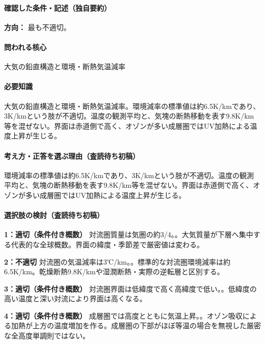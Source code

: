 \paragraph{確認した条件・記述（独自要約）}\mbox{}\par

\noindent\textbf{方向：} 最も不適切。\par

\paragraph{問われる核心} 大気の鉛直構造と環境・断熱気温減率

\paragraph{必要知識} 大気の鉛直構造と環境・断熱気温減率。環境減率の標準値は約6.5K/kmであり、3K/kmという肢が不適切。温度の観測平均と、気塊の断熱移動を表す9.8K/km等を混ぜない。界面は赤道側で高く、オゾンが多い成層圏ではUV加熱による温度上昇が生じる。

\paragraph{考え方・正答を選ぶ理由（査読待ち初稿）} 環境減率の標準値は約6.5K/kmであり、3K/kmという肢が不適切。温度の観測平均と、気塊の断熱移動を表す9.8K/km等を混ぜない。界面は赤道側で高く、オゾンが多い成層圏ではUV加熱による温度上昇が生じる。

\paragraph{選択肢の検討（査読待ち初稿）}\mbox{}\par

\noindent\textbf{1：適切（条件付き概数）} 対流圏質量は気圏の約3/4。。大気質量が下層へ集中する代表的な全球概数。界面の緯度・季節差で厳密値は変わる。\par

\noindent\textbf{2：不適切} 対流圏の気温減率は3℃/km。。標準的な対流圏環境減率は約6.5K/km。乾燥断熱9.8K/kmや湿潤断熱・実際の逆転層と区別する。\par

\noindent\textbf{3：適切（条件付き概数）} 対流圏界面は低緯度で高く高緯度で低い。。低緯度の高い温度と深い対流により界面は高くなる。\par

\noindent\textbf{4：適切（条件付き概数）} 成層圏では高度とともに気温上昇。。オゾン吸収による加熱が上方の温度増加を作る。成層圏の下部がほぼ等温の場合を無視した厳密な全高度単調則ではない。\par

